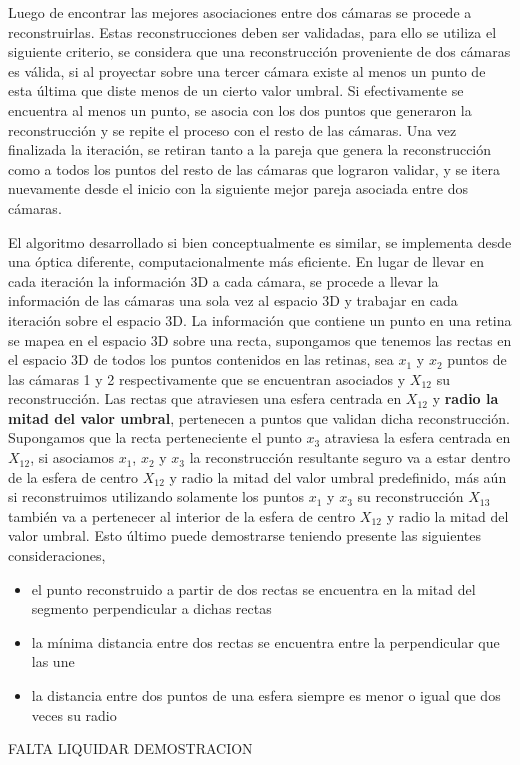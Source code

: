 Luego de encontrar las mejores asociaciones entre dos cámaras se procede a reconstruirlas. Estas reconstrucciones deben ser validadas, para ello se utiliza el siguiente criterio, se considera que una reconstrucción proveniente de dos cámaras es válida, si al proyectar sobre una tercer cámara existe al menos un punto de esta última que diste menos de un cierto valor umbral. Si efectivamente se encuentra al menos un punto, se asocia con los dos puntos que generaron la reconstrucción y se repite el proceso con el resto de las cámaras. Una vez finalizada la iteración, se retiran tanto a la pareja que genera la reconstrucción como a todos los puntos del resto de las cámaras que lograron validar, y se itera nuevamente desde el inicio con la siguiente mejor pareja asociada entre dos cámaras.  


El algoritmo desarrollado si bien conceptualmente es similar, se implementa desde una óptica diferente, computacionalmente más eficiente.
En lugar de llevar en cada iteración la información 3D a cada cámara, se procede a llevar la información de las cámaras una sola vez al espacio 3D y trabajar en cada iteración sobre el espacio 3D. La información que contiene un punto en una retina se mapea en el espacio 3D sobre una recta, supongamos que tenemos las rectas en el espacio 3D de todos los puntos contenidos en las retinas, sea $x_1$ y $x_2$ puntos de las cámaras 1 y 2 respectivamente que se encuentran asociados y $X_{12}$ su reconstrucción. Las rectas que atraviesen una esfera centrada en $X_{12}$ y \textbf{radio la mitad del valor umbral}, pertenecen a puntos que validan dicha reconstrucción.  Supongamos que la recta perteneciente el punto $x_3$ atraviesa la esfera centrada en $X_{12}$, si asociamos $x_1$, $x_2$ y $x_3$ la reconstrucción resultante seguro va a estar dentro de la esfera de centro $X_{12}$ y radio la mitad del valor umbral  predefinido, más aún si reconstruimos utilizando solamente los puntos $x_1$ y $x_3$ su reconstrucción $X_{13}$ también va a pertenecer al interior de la esfera de centro $X_{12}$ y radio la mitad del valor umbral. 
Esto último puede demostrarse teniendo presente las siguientes consideraciones,
\begin{itemize}
\item el punto reconstruido a partir de dos rectas se encuentra en la mitad del segmento perpendicular a dichas rectas
\item la mínima distancia entre dos rectas se encuentra entre la perpendicular que las une
\item la distancia entre dos puntos de una esfera siempre es menor o igual que dos veces su radio
\end{itemize}

 FALTA LIQUIDAR DEMOSTRACION 

